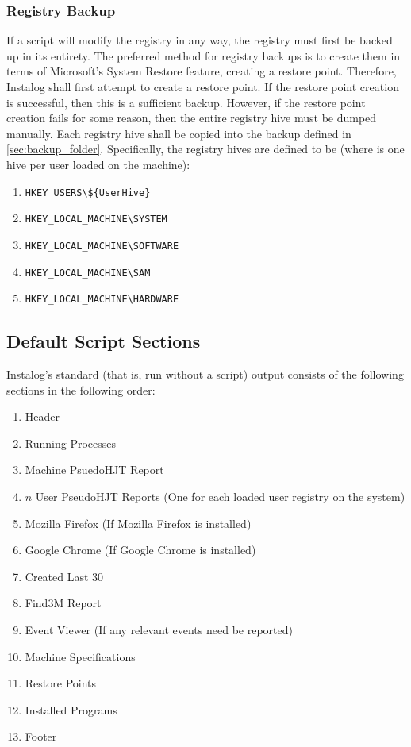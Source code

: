 \subsubsection{Registry Backup} \label{sec:reg_backup}
If a script will modify the registry in any way, the registry must first be
backed up in its entirety.  The preferred method for registry backups is to
create them in terms of Microsoft's System Restore feature, creating a  restore
point. Therefore, Instalog shall first attempt to create a restore point.  If
the restore point creation is successful, then this is a sufficient backup.
However, if the restore point creation fails for some reason, then the entire
registry hive must be dumped manually.  Each registry hive shall be copied into
the backup defined in \ref{sec:backup_folder}. Specifically, the registry hives
are defined to be (where  is one hive per user loaded on the
machine):
\begin{enumerate}
    \item \verb|HKEY_USERS\${UserHive}|
    \item \verb|HKEY_LOCAL_MACHINE\SYSTEM|
    \item \verb|HKEY_LOCAL_MACHINE\SOFTWARE|
    \item \verb|HKEY_LOCAL_MACHINE\SAM|
    \item \verb|HKEY_LOCAL_MACHINE\HARDWARE|
\end{enumerate}

\subsection{Default Script Sections} \label{sec:default_script_sections}
Instalog's standard (that is, run without a script) output consists of the
following sections in the following order:
\begin{enumerate}
    \item Header
    \item Running Processes
    \item Machine PsuedoHJT Report
    \item $n$ User PseudoHJT Reports (One for each loaded user registry on the
    system)
    \item Mozilla Firefox (If Mozilla Firefox is installed)
    \item Google Chrome (If Google Chrome is installed)
    \item Created Last 30
    \item Find3M Report
    \item Event Viewer (If any relevant events need be reported)
    \item Machine Specifications
    \item Restore Points
    \item Installed Programs
    \item Footer
\end{enumerate}

